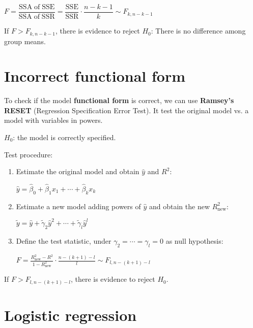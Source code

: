 \documentclass[10pt, a4paper, landscape]{extarticle}
\newcommand{\SSR}{\mathrm{SSR}}
\newcommand{\SSE}{\mathrm{SSE}}
\begin{document}
\begin{multicols}{3}
\begin{center}
	$F = \dfrac{\mathrm{SSA \; of \;} \SSE}{\mathrm{SSA \; of \;} \SSR} = \dfrac{\SSE}{\SSR} \cdot \dfrac{n - k - 1}{k} \sim F_{k, n - k - 1}$
\end{center}

If $F > F_{k, n - k - 1}$, there is evidence to reject $H_0$: There is no difference among group means.

\columnbreak

\section*{Incorrect functional form}

To check if the model \textbf{functional form} is correct, we can use \textbf{Ramsey's RESET} (Regression Specification Error Test). It test the original model vs. a model with variables in powers.

\begin{center}
	$H_0$: the model is correctly specified.
\end{center}

Test procedure:

\begin{enumerate}[leftmargin=*]
	\item Estimate the original model and obtain $\hat{y}$ and $R^2$:
	\begin{center}
		$\hat{y} = \hat{\beta}_0 + \hat{\beta}_1 x_1 + \cdots + \hat{\beta}_k x_k$
	\end{center}
	\item Estimate a new model adding powers of $\hat{y}$ and obtain the new $R^2_{\mathrm{new}}$:
	\begin{center}
		$\tilde{y} = \hat{y} + \tilde{\gamma}_2 \hat{y}^2 + \cdots + \tilde{\gamma}_l \hat{y}^l$
	\end{center}
	\item Define the test statistic, under $\gamma_2 = \cdots = \gamma_l = 0$ as null hypothesis:
	\begin{center}
		$F = \frac{R^2_{\mathrm{new}} - R^2}{1 - R^2_{\mathrm{new}}} \cdot \frac{n - (k + 1) - l}{l} \sim F_{l, n - (k + 1) - l}$
	\end{center}
\end{enumerate}

If $F > F_{l, n - (k + 1) - l}$, there is evidence to reject $H_0$.

\section*{Logistic regression}


\end{multicols}
\end{document}
